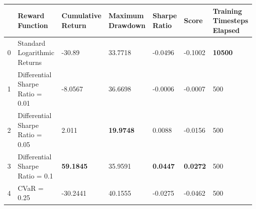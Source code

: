 \begin{tabular}{lllllll}
\toprule
 & Reward Function & Cumulative Return & Maximum Drawdown & Sharpe Ratio & Score & Training Timesteps Elapsed \\
\midrule
0 & Standard Logarithmic Returns & -30.89 & 33.7718 & -0.0496 & -0.1002 & \textbf{10500} \\
1 & Differential Sharpe Ratio = 0.01 & -8.0567 & 36.6698 & -0.0006 & -0.0007 & 500 \\
2 & Differential Sharpe Ratio = 0.05 & 2.011 & \textbf{19.9748} & 0.0088 & -0.0156 & 500 \\
3 & Differential Sharpe Ratio = 0.1 & \textbf{59.1845} & 35.9591 & \textbf{0.0447} & \textbf{0.0272} & 500 \\
4 & CVaR = 0.25 & -30.2441 & 40.1555 & -0.0275 & -0.0462 & 500 \\
\bottomrule
\end{tabular}
